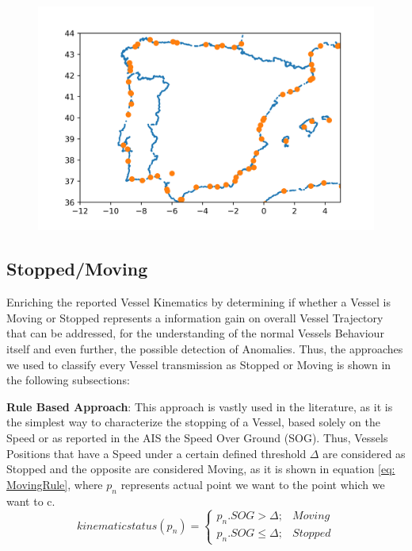 \begin{figure}[H]
	\centering
	\includegraphics[scale = .9]{figures/Ch4/ports.png}
    \caption{}
    \label{fig:asdsadsadasda}
\end{figure}


\subsection{Stopped/Moving}
\label{subsection: Stopped/Moving}
Enriching the reported Vessel Kinematics by determining if whether a Vessel is Moving or Stopped represents a information gain on overall Vessel Trajectory that can be addressed, for the understanding of the normal Vessels Behaviour itself and even further, the possible detection of Anomalies.
Thus, the approaches we used to classify every Vessel transmission as Stopped or Moving is shown in the following subsections:

\textbf{Rule Based Approach}:
This approach is vastly used in the literature, as it is the simplest way to characterize the stopping of a Vessel, based solely on the Speed or as reported in the AIS the Speed Over Ground (SOG). Thus, Vessels Positions that have a Speed under a certain defined threshold $\Delta$ are considered as Stopped and the opposite are considered Moving, as it is shown in equation \ref{eq: MovingRule}, where $p_n$ represents actual point we want to the point which we want to c.
\begin{equation}
kinematic status(p_n) = \left\{\begin{matrix}
p_n.SOG > \Delta; & Moving\\ 
p_n.SOG \leq  \Delta; & Stopped
\end{matrix}\right.
\label{eq: MovingRule}
\end{equation}

